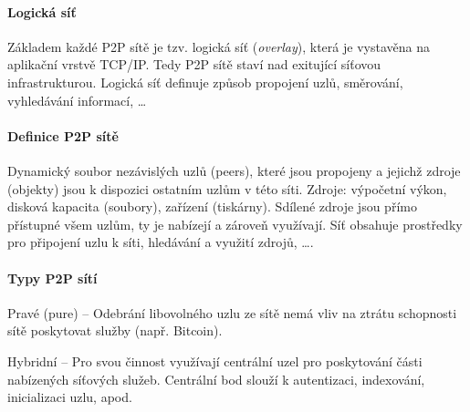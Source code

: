 \paragraph*{Logická síť} Základem každé P2P sítě je tzv. logická síť (\textit{overlay}), která je vystavěna na aplikační vrstvě TCP/IP. Tedy P2P sítě staví nad exitující síťovou infrastrukturou. Logická síť definuje způsob propojení uzlů, směrování, vyhledávání informací, \dots

\paragraph*{Definice P2P sítě} Dynamický soubor nezávislých uzlů (peers), které jsou propojeny a jejichž zdroje (objekty) jsou k dispozici ostatním uzlům v této síti. Zdroje: výpočetní výkon, disková kapacita (soubory), zařízení (tiskárny). Sdílené zdroje jsou přímo přístupné všem uzlům, ty je nabízejí a zároveň využívají. Síť obsahuje prostředky pro připojení uzlu k síti, hledávání a využití zdrojů, \dots.

\paragraph*{Typy P2P sítí} \begin{compactitem}
    \item Pravé (pure) -- Odebrání libovolného uzlu ze sítě nemá vliv na ztrátu schopnosti sítě poskytovat služby (např. Bitcoin).
    \item Hybridní -- Pro svou činnost využívají centrální uzel pro poskytování části nabízených síťových služeb. Centrální bod slouží k autentizaci, indexování, inicializaci uzlu, apod.
\end{compactitem}

